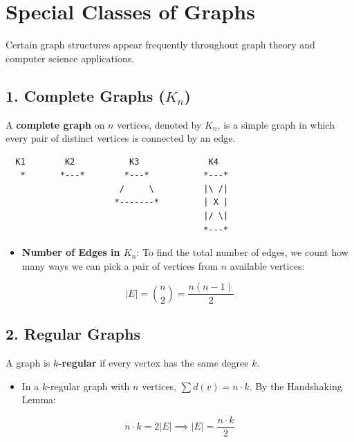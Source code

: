\documentclass[
]{book}
\providecommand{\tightlist}{%
  \setlength{\itemsep}{0pt}\setlength{\parskip}{0pt}}
\theoremstyle{definition}
\theoremstyle{definition}
\theoremstyle{definition}
\theoremstyle{definition}
\theoremstyle{remark}
\begin{document}
\section{Special Classes of Graphs}\label{special-classes-of-graphs}

Certain graph structures appear frequently throughout graph theory and computer science applications.

\subsection{\texorpdfstring{1. Complete Graphs (\(K_n\))}{1. Complete Graphs (K\_n)}}\label{complete-graphs-k_n}

A \textbf{complete graph} on \(n\) vertices, denoted by \(K_n\), is a simple graph in which every pair of distinct vertices is connected by an edge.

\begin{verbatim}
  K1        K2           K3              K4
   *       *---*        *---*           *---*
                       /     \          |\ /|
                      *-------*         | X |
                                        |/ \|
                                        *---*
\end{verbatim}

\begin{itemize}
\tightlist
\item
  \textbf{Number of Edges in \(K_n\)}:
  To find the total number of edges, we count how many ways we can pick a pair of vertices from \(n\) available vertices:
\end{itemize}

\[\vert{}E\vert{} = \binom{n}{2} = \frac{n(n - 1)}{2}\]

\subsection{2. Regular Graphs}\label{regular-graphs}

A graph is \textbf{\(k\)-regular} if every vertex has the same degree \(k\).

\begin{itemize}
\tightlist
\item
  In a \(k\)-regular graph with \(n\) vertices, \(\sum d(v) = n \cdot k\). By the Handshaking Lemma:
\end{itemize}

\[n \cdot k = 2\vert{}E\vert{} \implies \vert{}E\vert{} = \frac{n \cdot k}{2}\]
\end{document}
